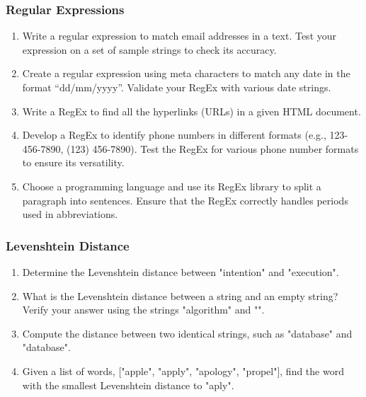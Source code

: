 \begin{advanced}
\begin{exerciseboxcomputer}
\subsubsection*{Regular Expressions}
\begin{enumerate}
    \item Write a regular expression to match email addresses in a text. Test your expression on a set of sample strings to check its accuracy.
    \item Create a regular expression using meta characters to match any date in the format ``dd/mm/yyyy''. Validate your RegEx with various date strings.
    \item Write a RegEx to find all the hyperlinks (URLs) in a given HTML document.
    \item Develop a RegEx to identify phone numbers in different formats (e.g., 123-456-7890, (123) 456-7890). Test the RegEx for various phone number formats to ensure its versatility.
    \item Choose a programming language and use its RegEx library to split a paragraph into sentences. Ensure that the RegEx correctly handles periods used in abbreviations.
\end{enumerate}
\end{exerciseboxcomputer}

\begin{exerciseboxcomputer}
\subsubsection*{Levenshtein Distance}
\begin{enumerate}
    \item Determine the Levenshtein distance between "intention" and "execution".
    \item What is the Levenshtein distance between a string and an empty string? Verify your answer using the strings "algorithm" and "".
    \item Compute the distance between two identical strings, such as "database" and "database".
    \item Given a list of words, ["apple", "apply", "apology", "propel"], find the word with the smallest Levenshtein distance to "aply".
\end{enumerate}
\end{exerciseboxcomputer}
\end{advanced}

